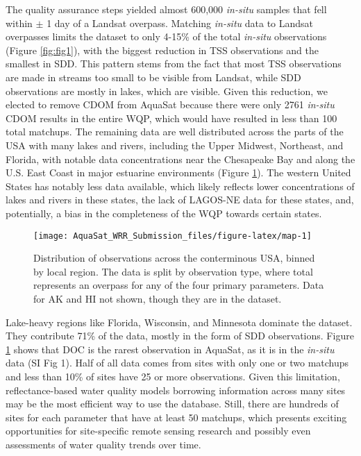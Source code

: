 \documentclass[draft,linenumbers]{agujournal2018}
\begin{document}
The quality assurance steps yielded almost 600,000 \emph{in-situ}
samples that fell within \(\pm\) 1 day of a Landsat overpass. Matching
\emph{in-situ} data to Landsat overpasses limits the dataset to only
4-15\% of the total \emph{in-situ} observations (Figure \ref{fig:fig1}),
with the biggest reduction in TSS observations and the smallest in SDD.
This pattern stems from the fact that most TSS observations are made in
streams too small to be visible from Landsat, while SDD observations are
mostly in lakes, which are visible. Given this reduction, we elected to
remove CDOM from AquaSat because there were only 2761 \emph{in-situ}
CDOM results in the entire WQP, which would have resulted in less than
100 total matchups. The remaining data are well distributed across the
parts of the USA with many lakes and rivers, including the Upper
Midwest, Northeast, and Florida, with notable data concentrations near
the Chesapeake Bay and along the U.S. East Coast in major estuarine
environments (Figure \ref{fig:map}). The western United States has
notably less data available, which likely reflects lower concentrations
of lakes and rivers in these states, the lack of LAGOS-NE data for these
states, and, potentially, a bias in the completeness of the WQP towards
certain states.

\begin{figure}[h]
\texttt{[image: AquaSat\_WRR\_Submission\_files/figure-latex/map-1]} \caption{Distribution of observations across the conterminous USA, binned by local region. The data is split by observation type, where total represents an overpass for any of the four primary parameters. Data for AK and HI not shown, though they are in the dataset.}\label{fig:map}
\end{figure}

Lake-heavy regions like Florida, Wisconsin, and Minnesota dominate the
dataset. They contribute 71\% of the data, mostly in the form of SDD
observations. Figure \ref{fig:map} shows that DOC is the rarest
observation in AquaSat, as it is in the \emph{in-situ} data (SI Fig 1).
Half of all data comes from sites with only one or two matchups and less
than 10\% of sites have 25 or more observations. Given this limitation,
reflectance-based water quality models borrowing information across many
sites may be the most efficient way to use the database. Still, there
are hundreds of sites for each parameter that have at least 50 matchups,
which presents exciting opportunities for site-specific remote sensing
research and possibly even assessments of water quality trends over
time.
\end{document}
